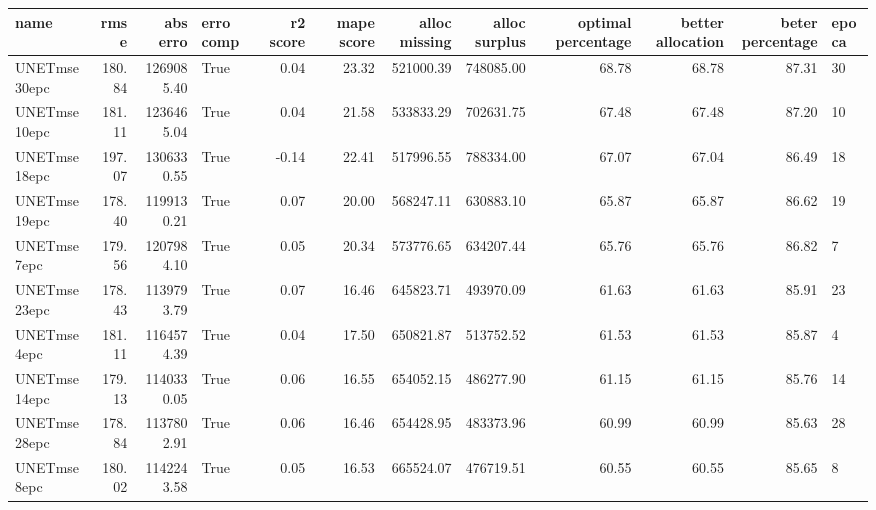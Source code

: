 \begin{tabular}{lrrlrrrrrrrl}
\toprule
name & rmse & abs erro & erro comp & r2 score & mape score & alloc missing & alloc surplus & optimal percentage & better allocation & beter percentage & epoca \\
\midrule
UNETmse30epc & 180.84 & 1269085.40 & True & 0.04 & 23.32 & 521000.39 & 748085.00 & 68.78 & 68.78 & 87.31 & 30 \\
UNETmse10epc & 181.11 & 1236465.04 & True & 0.04 & 21.58 & 533833.29 & 702631.75 & 67.48 & 67.48 & 87.20 & 10 \\
UNETmse18epc & 197.07 & 1306330.55 & True & -0.14 & 22.41 & 517996.55 & 788334.00 & 67.07 & 67.04 & 86.49 & 18 \\
UNETmse19epc & 178.40 & 1199130.21 & True & 0.07 & 20.00 & 568247.11 & 630883.10 & 65.87 & 65.87 & 86.62 & 19 \\
UNETmse7epc & 179.56 & 1207984.10 & True & 0.05 & 20.34 & 573776.65 & 634207.44 & 65.76 & 65.76 & 86.82 & 7 \\
UNETmse23epc & 178.43 & 1139793.79 & True & 0.07 & 16.46 & 645823.71 & 493970.09 & 61.63 & 61.63 & 85.91 & 23 \\
UNETmse4epc & 181.11 & 1164574.39 & True & 0.04 & 17.50 & 650821.87 & 513752.52 & 61.53 & 61.53 & 85.87 & 4 \\
UNETmse14epc & 179.13 & 1140330.05 & True & 0.06 & 16.55 & 654052.15 & 486277.90 & 61.15 & 61.15 & 85.76 & 14 \\
UNETmse28epc & 178.84 & 1137802.91 & True & 0.06 & 16.46 & 654428.95 & 483373.96 & 60.99 & 60.99 & 85.63 & 28 \\
UNETmse8epc & 180.02 & 1142243.58 & True & 0.05 & 16.53 & 665524.07 & 476719.51 & 60.55 & 60.55 & 85.65 & 8 \\
\bottomrule
\end{tabular}

